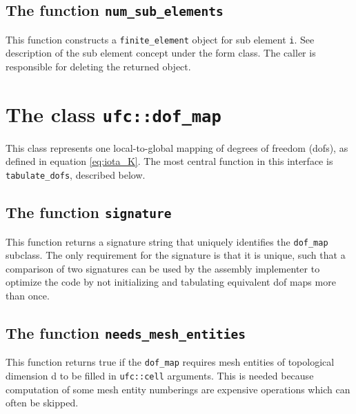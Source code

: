 \subsection{The function \texttt{num\_sub\_elements}}
This function constructs a \texttt{finite\_element} object for sub element \texttt{i}.
See description of the sub element concept under the form class.
The caller is responsible for deleting the returned object.




\section{The class \texttt{ufc::dof\_map}}

This class represents one local-to-global mapping of degrees of freedom (dofs),
as defined in equation \eqref{eq:iota_K}.
The most central function in this interface is \texttt{tabulate\_dofs}, described below.






\subsection{The function \texttt{signature}}
This function returns a signature string that uniquely identifies the \texttt{dof\_map} subclass.
The only requirement for the signature is that it is unique, such
that a comparison of two signatures can be used by the assembly
implementer to optimize the code by not initializing and tabulating equivalent dof maps more than once.


\subsection{The function \texttt{needs\_mesh\_entities}}
This function returns true if the \texttt{dof\_map} requires mesh entities
of topological dimension d to be filled in \texttt{ufc::cell} arguments.
This is needed because computation of some mesh entity numberings
are expensive operations which can often be skipped.

